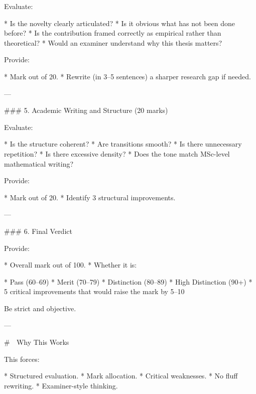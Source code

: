 Evaluate:

* Is the novelty clearly articulated?
* Is it obvious what has not been done before?
* Is the contribution framed correctly as empirical rather than theoretical?
* Would an examiner understand why this thesis matters?

Provide:

* Mark out of 20.
* Rewrite (in 3–5 sentences) a sharper research gap if needed.

---

### 5. Academic Writing and Structure (20 marks)

Evaluate:

* Is the structure coherent?
* Are transitions smooth?
* Is there unnecessary repetition?
* Is there excessive density?
* Does the tone match MSc-level mathematical writing?

Provide:

* Mark out of 20.
* Identify 3 structural improvements.

---

### 6. Final Verdict

Provide:

* Overall mark out of 100.
* Whether it is:

  * Pass (60–69)
  * Merit (70–79)
  * Distinction (80–89)
  * High Distinction (90+)
* 5 critical improvements that would raise the mark by 5–10%

Be strict and objective.

---

# 🧠 Why This Works

This forces:

* Structured evaluation.
* Mark allocation.
* Critical weaknesses.
* No fluff rewriting.
* Examiner-style thinking.


